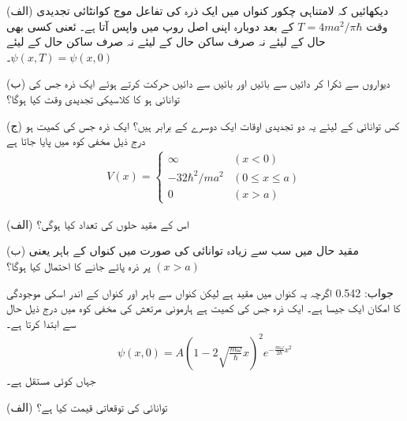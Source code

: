 \documentclass[leqno, b5paper]{khalid-urdu-book}
\begin{document}

(الف) دیکھائیں کہ لامتناہی چکور کنواں میں ایک ذرہ کی تفاعل موج کوانٹائی تجدیدی وقت \(T = 4ma^2/\pi\hbar\) کے بعد دوبارہ اپنی اصل روپ میں واپس آتا ہے۔ ئعنی کسی بھی حال کے لیئے نہ صرف ساکن حال کے لیئے نہ صرف ساکن حال کے لیئے \(\psi(x, T) = \psi(x, 0)\)۔

(ب) دیواروں سے ٹکرا کر دائیں سے بائیں اور بائیں سے دائیں حرکت کرتے ہوئے ایک ذرہ جس کی توانائی  ہو کا کلاسیکی تجدیدی وقت کیا ہوگا؟

(ج) کس توانائی کے لیئے یہ دو تجدیدی اوقات ایک دوسرے کے برابر ہیں؟  
ایک ذرہ جس کی کمیت  ہو درج ذیل مخفی کوہ میں پایا جاتا ہے
\begin{align*}
	V(x)=
	\begin{cases}
		\infty & (x<0) \\
		-32\hbar^2/ma^2 & (0\leq x\leq a) \\
		0 & (x>a) 
	\end{cases}
\end{align*}

(الف) اس کے مقید حلوں کی تعداد کیا ہوگی؟

(ب) مقید حال میں سب سے زیادہ توانائی کی صورت میں کنواں کے باہر یعنی \((x>a)\) پر ذرہ پائے جانے کا احتمال کیا ہوگا؟

جواب: \num{0.542} اگرچہ یہ کنواں میں مقید ہے لیکن کنواں سے باہر اور کنواں کے اندر اسکی موجودگی کا امکان ایک جیسا ہے۔  
ایک ذرہ جس کی کمیت  ہے ہارمونی مرتعش کی مخفی کوہ میں درج ذیل حال سے ابتدا کرتا ہے۔
\begin{align*}
	\psi(x, 0) = A(1-2\sqrt{\frac{m\omega}{\hbar}}x)^2e^{-\frac{m\omega}{2\hbar}x^2}
\end{align*}
جہاں  کوئی مستقل ہے۔

(الف) توانائی کی توقعاتی قیمت کیا ہے؟
\end{document}
